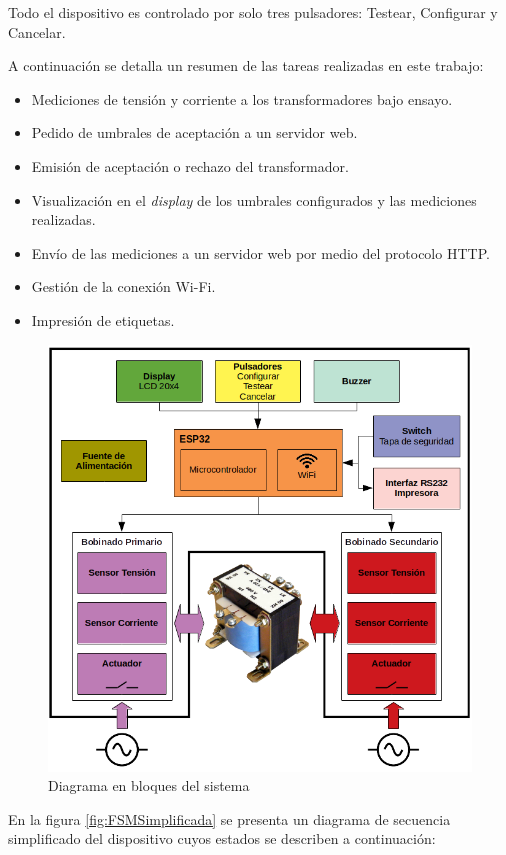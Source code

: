 Todo el dispositivo es controlado por solo tres pulsadores: Testear, Configurar y Cancelar.

A continuación se detalla un resumen de las tareas realizadas en este trabajo:
\begin{itemize}
\item Mediciones de tensión y corriente a los transformadores bajo ensayo.
\item Pedido de umbrales de aceptación a un servidor web.
\item Emisión de aceptación o rechazo del transformador.
\item Visualización en el \textit{display} de los umbrales configurados y las mediciones realizadas.
\item Envío de las mediciones a un servidor web por medio del protocolo HTTP.
\item Gestión de la conexión Wi-Fi.
\item Impresión de etiquetas. 
\end{itemize}

\begin{figure}[htpb]
\centering 
\includegraphics[width=.8\textwidth]{./Figures/diagBloques.png}
\caption{Diagrama en bloques del sistema}
\label{fig:diagBloques}
\end{figure}


En la figura \ref{fig:FSMSimplificada} se presenta un diagrama de secuencia simplificado del dispositivo cuyos estados se describen a continuación:

